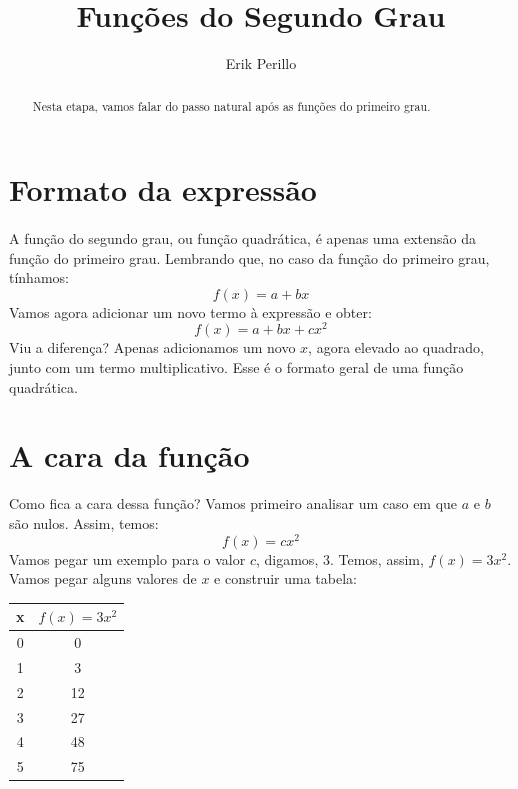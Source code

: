 \documentclass[11pt]{article}
\begin{document}
\title{Funções do Segundo Grau}
\author{Erik Perillo}
\date{}
\maketitle
\begin{abstract}
Nesta etapa, vamos falar do passo natural após as funções do primeiro grau.
\end{abstract}

\newpage

\tableofcontents

\newpage

\section{Formato da expressão}
\paragraph{}
A função do segundo grau, ou função quadrática,
é apenas uma extensão da função do primeiro grau.
Lembrando que, no caso da função do primeiro grau, tínhamos:
$$f(x) = a + bx$$
Vamos agora adicionar um novo termo à expressão e obter:
$$f(x) = a + bx + cx^2$$
Viu a diferença? Apenas adicionamos um novo $x$, agora elevado ao quadrado, 
junto com um termo multiplicativo. Esse é o formato geral de uma função 
quadrática.

\section{A cara da função}
Como fica a cara dessa função? Vamos primeiro analisar um caso em que 
$a$ e $b$ são nulos. Assim, temos:
$$f(x) = cx^2$$
Vamos pegar um exemplo para o valor $c$, digamos, $3$. Temos, assim, 
$f(x) = 3x^2$. Vamos pegar alguns valores de $x$ e construir uma tabela:
\newline
\begin{table}[H]
	\centering
	\begin{tabular}{| c | c |}
		\hline
		x & $f(x) = 3x^2$\\
		\hline
		0 & 0\\
		\hline
		1 & 3\\
		\hline
		2 & 12\\
		\hline
		3 & 27\\
		\hline
		4 & 48\\
		\hline
		5 & 75\\
		\hline
	\end{tabular}
\end{table}
\end{document}
